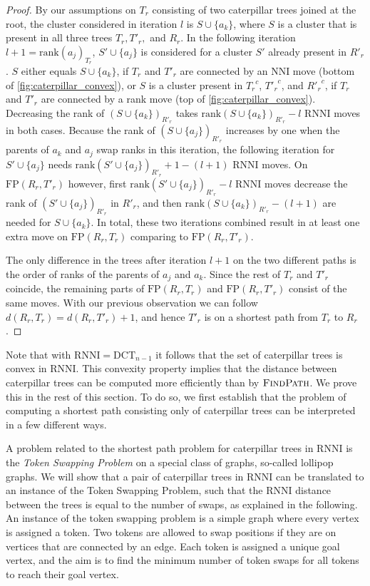 \documentclass[11pt]{amsart}
\newcommand{\rnni}{\mathrm{RNNI}}
\newcommand{\findpath}{\textsc{FindPath}}
\newcommand{\rank}{\mathrm{rank}}
\newcommand{\nni}{\mathrm{NNI}}
\newcommand{\fp}{\mathrm{FP}}
\newcommand{\dct}{\mathrm{DCT}}
\begin{document}
\begin{proof}
	By our assumptions on $T_r$ consisting of two caterpillar trees joined at the root, the cluster considered in iteration $l$ is $S \cup \{a_k\}$, where $S$ is a cluster that is present in all three trees $T_r, T'_r,$ and $R_r$.
	In the following iteration $l+1 = \rank(a_j)_{T_r}$, $S' \cup \{a_j\}$ is considered for a cluster $S'$ already present in $R'_r$.
	$S$ either equals $S \cup \{a_k\}$, if $T_r$ and $T'_r$ are connected by an $\nni$ move (bottom of \autoref{fig:caterpillar_convex}), or $S$ is a cluster present in ${T_r}^c$, ${T'_r}^c$, and ${R'_r}^c$, if $T_r$ and $T'_r$ are connected by a rank move (top of \autoref{fig:caterpillar_convex}).
	Decreasing the rank of $(S \cup \{a_k\})_{R'_r}$ takes $\rank(S \cup \{a_k\})_{R'_r} - l$ $\rnni$ moves in both cases.
	Because the rank of $(S \cup \{a_j\})_{R'_r}$ increases by one when the parents of $a_k$ and $a_j$ swap ranks in this iteration, the following iteration for $S' \cup \{a_j\}$ needs $\rank(S' \cup \{a_j\})_{R'_r} + 1 - (l+1)$ $\rnni$ moves.
	On $\fp(R_r,T'_r)$ however, first $\rank(S' \cup \{a_j\})_{R'_r} - l$ $\rnni$ moves decrease the rank of $(S' \cup \{a_j\})_{R'_r}$ in $R'_r$, and then $\rank(S \cup \{a_k\})_{R'_r} - (l+1)$ are needed for $S \cup \{a_k\}$.
	In total, these two iterations combined result in at least one extra move on $\fp(R_r, T_r)$ comparing to $\fp(R_r, T'_r)$.

	The only difference in the trees after iteration $l+1$ on the two different paths is the order of ranks of the parents of $a_j$ and $a_k$.
	Since the rest of $T_r$ and $T'_r$ coincide, the remaining parts of $\fp(R_r, T_r)$ and $\fp(R_r, T'_r)$ consist of the same moves.
	With our previous observation we can follow $d(R_r,T_r) = d(R_r,T'_r) + 1$, and hence $T'_r$ is on a shortest path from $T_r$ to $R_r$.
\end{proof}

Note that with $\rnni = \dct_{n-1}$ it follows that the set of caterpillar trees is convex in $\rnni$.
This convexity property implies that the distance between caterpillar trees can be computed more efficiently than by $\findpath$.
We prove this in the rest of this section.
To do so, we first establish that the problem of computing a shortest path consisting only of caterpillar trees can be interpreted in a few different ways.

A problem related to the shortest path problem for caterpillar trees in $\rnni$ is the \emph{Token Swapping Problem} \autocite{Kawahara2017-ey} on a special class of graphs, so-called lollipop graphs.
We will show that a pair of caterpillar trees in $\rnni$ can be translated to an instance of the Token Swapping Problem, such that the $\rnni$ distance between the trees is equal to the number of swaps, as explained in the following.
An instance of the token swapping problem is a simple graph where every vertex is assigned a token.
Two tokens are allowed to swap positions if they are on vertices that are connected by an edge.
Each token is assigned a unique goal vertex, and the aim is to find the minimum number of token swaps for all tokens to reach their goal vertex.
\end{document}
